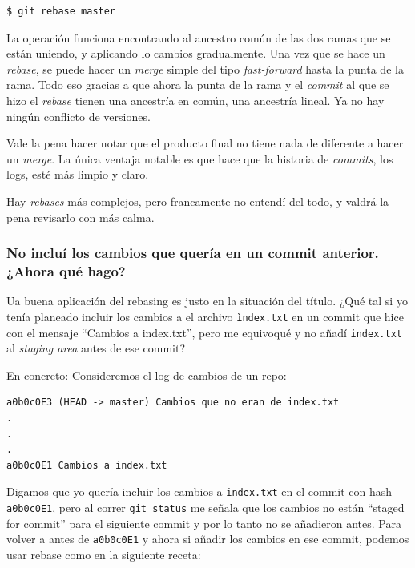 \documentclass[spanish, 12pt, a4paper]{article}
\begin{document}
\begin{lstlisting}
$ git rebase master
\end{lstlisting}

La operación funciona encontrando al ancestro común de las dos ramas que
se están uniendo, y aplicando lo cambios gradualmente. Una vez que se
hace un \emph{rebase}, se puede hacer un \emph{merge} simple del tipo
\emph{fast-forward} hasta la punta de la rama. Todo eso gracias a que
ahora la punta de la rama y el \emph{commit} al que se hizo el
\emph{rebase} tienen una ancestría en común, una ancestría lineal. Ya no
hay ningún conflicto de versiones.

Vale la pena hacer notar que el producto final no tiene nada de
diferente a hacer un \emph{merge}. La única ventaja notable es que hace
que la historia de \emph{commits}, los logs, esté más limpio y claro.

Hay \emph{rebases} más complejos, pero francamente no entendí del todo,
y valdrá la pena revisarlo con más calma.

\subsubsection{No incluí los cambios que quería en un commit anterior.
¿Ahora qué hago?}

Ua buena aplicación del rebasing es justo en la situación del título.
¿Qué tal si yo tenía planeado incluir los cambios a el archivo
\passthrough{\lstinline!ìndex.txt!} en un commit que hice con el mensaje
``Cambios a index.txt'', pero me equivoqué y no añadí
\passthrough{\lstinline!index.txt!} al \emph{staging area} antes de ese
commit?

En concreto: Consideremos el log de cambios de un repo:

\begin{lstlisting}
a0b0c0E3 (HEAD -> master) Cambios que no eran de index.txt
.
.
.
a0b0c0E1 Cambios a index.txt
\end{lstlisting}

Digamos que yo quería incluir los cambios a
\passthrough{\lstinline!index.txt!} en el commit con hash
\passthrough{\lstinline!a0b0c0E1!}, pero al correr
\passthrough{\lstinline!git status!} me señala que los cambios no están
``staged for commit'' para el siguiente commit y por lo tanto no se
añadieron antes. Para volver a antes de
\passthrough{\lstinline!a0b0c0E1!} y ahora si añadir los cambios en ese
commit, podemos usar rebase como en la siguiente receta:
\end{document}

